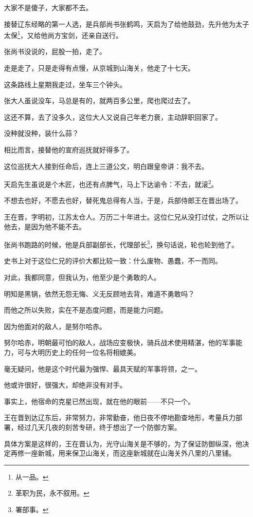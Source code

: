 \begin{multicols}{\theparacolNo}
大家不是傻子，大家都不去。

接替辽东经略的第一人选，是兵部尚书张鹤鸣，天启为了给他鼓劲，先升他为太子太保\footnote{从一品。}，又给他尚方宝剑，还亲自送行。

张尚书没说的，屁股一拍，走了。

走是走了，只是走得有点慢，从京城到山海关，他走了十七天。

这条路线上星期我走过，坐车三个钟头。

张大人虽说没车，马总是有的，就两百多公里，爬也爬过去了。

这还不算，去了没多久，这位大人又说自己年老力衰，主动辞职回家了。

没种就没种，装什么蒜？

相比而言，接替他的宣府巡抚就好得多了。

这位巡抚大人接到任命后，连上三道公文，明白跟皇帝讲：我不去。

天启先生虽说是个木匠，也还有点脾气，马上下达谕令：不去，就滚\footnote{革职为民，永不叙用。}。

不想去也好，不愿去也好，替死鬼总得有人当，于是，兵部侍郎王在晋出场了。

王在晋，字明初，江苏太仓人。万历二十年进士。这位仁兄从没打过仗，之所以让他去，是因为他不能不去。

张尚书跑路的时候，他是兵部副部长，代理部长\footnote{署部事。}，换句话说，轮也轮到他了。

史书上对于这位仁兄的评价大都比较一致：什么废物、愚蠢，不一而同。

对此，我都同意，但我认为，他至少是个勇敢的人。

明知是黑锅，依然无怨无悔、义无反顾地去背，难道不勇敢吗？

而他之所以失败，实在不是态度问题，而是能力问题。

因为他面对的敌人，是努尔哈赤。

努尔哈赤，明朝最可怕的敌人，战场应变极快，骑兵战术使用精湛，他的军事能力，可与大明历史上的任何一位名将相媲美。

毫无疑问，他是这个时代最为强悍、最具天赋的军事将领，之一。

他或许很好，很强大，却绝非没有对手。

事实上，他宿命的克星已然出现，就在他的眼前——不只一个。

王在晋到达辽东后，非常努力，非常勤奋，他日夜不停地勘查地形，考量兵力部署，经过几天几夜的刻苦专研，终于想出了一个防御方案。

具体方案是这样的，王在晋认为，光守山海关是不够的，为了保证防御纵深，他决定再修一座新城，用来保卫山海关，而这座新城就在山海关外八里的八里铺。


\end{multicols}
